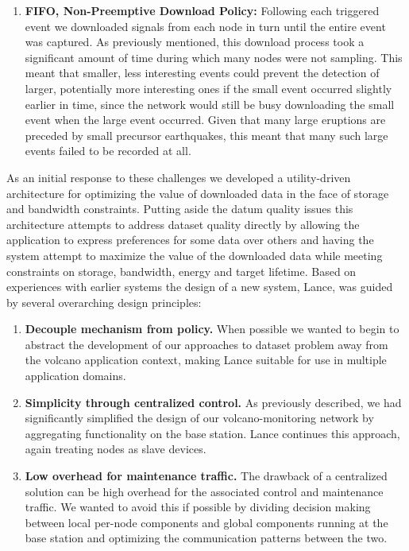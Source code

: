 \begin{enumerate}
\item \textbf{FIFO, Non-Preemptive Download Policy:} Following each triggered event
we downloaded signals from each node in turn until the entire event was
captured. As previously mentioned, this download process took a significant
amount of time during which many nodes were not sampling. This meant that
smaller, less interesting events could prevent the detection of larger,
potentially more interesting ones if the small event occurred slightly
earlier in time, since the network would still be busy downloading the small
event when the large event occurred.  Given that many large eruptions are
preceded by small precursor earthquakes, this meant that many such large
events failed to be recorded at all.
\end{enumerate}

As an initial response to these challenges we developed a utility-driven
architecture for optimizing the value of downloaded data in the face of
storage and bandwidth constraints.  Putting aside the datum quality issues
this architecture attempts to address dataset quality directly by allowing
the application to express preferences for some data over others and having
the system attempt to maximize the value of the downloaded data while meeting
constraints on storage, bandwidth, energy and target lifetime.  Based on
experiences with earlier systems the design of a new system, Lance, was
guided by several overarching design principles:

\begin{enumerate}
\item \textbf{Decouple mechanism from policy.} When possible we wanted to begin to
abstract the development of our approaches to dataset problem away from the
volcano application context, making Lance suitable for use in multiple
application domains.
\item \textbf{Simplicity through centralized control.} As previously described, we
had significantly simplified the design of our volcano-monitoring network
by aggregating functionality on the base station. Lance continues this
approach, again treating nodes as slave devices.
\item \textbf{Low overhead for maintenance traffic.} The drawback of a centralized
solution can be high overhead for the associated control and maintenance
traffic. We wanted to avoid this if possible by dividing decision making
between local per-node components and global components running at the base
station and optimizing the communication patterns between the two.
\end{enumerate}

